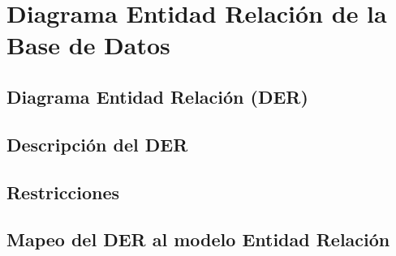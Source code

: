 
\section{Diagrama Entidad Relación de la Base de Datos}

\subsection{Diagrama Entidad Relación (DER)}

\subsection{Descripción del DER}

\subsection{Restricciones}

\subsection{Mapeo del DER al modelo Entidad Relación}
